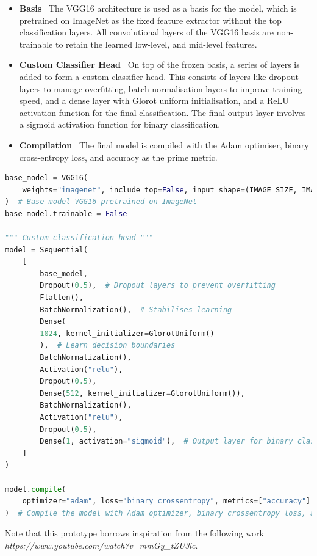 \documentclass[../main]{subfiles}
\begin{document}
\begin{itemize}
	\item \textbf{Basis} \textemdash\ The VGG16 architecture is used as a basis for the model, which is pretrained on ImageNet as the fixed feature extractor without the top classification layers. All convolutional layers of the VGG16 basis are non-trainable to retain the learned low-level, and mid-level features.
	\item \textbf{Custom Classifier Head} \textemdash\ On top of the frozen basis, a series of layers is added to form a custom classifier head. This consists of layers like dropout layers to manage overfitting, batch normalisation layers to improve training speed, and a dense layer with Glorot uniform initialisation, and a ReLU activation function for the final classification. The final output layer involves a sigmoid activation function for binary classification.
	\item \textbf{Compilation} \textemdash\ The final model is compiled with the Adam optimiser, binary cross-entropy loss, and accuracy as the prime metric.
\end{itemize}

\begin{lstlisting}[language=Python, caption={Prototype model definition.}]
base_model = VGG16(
	weights="imagenet", include_top=False, input_shape=(IMAGE_SIZE, IMAGE_SIZE, 3)
)  # Base model VGG16 pretrained on ImageNet
base_model.trainable = False

""" Custom classification head """
model = Sequential(
	[
	    base_model,
	    Dropout(0.5),  # Dropout layers to prevent overfitting
	    Flatten(),
	    BatchNormalization(),  # Stabilises learning
	    Dense(
		1024, kernel_initializer=GlorotUniform()
	    ),  # Learn decision boundaries
	    BatchNormalization(),
	    Activation("relu"),
	    Dropout(0.5),
	    Dense(512, kernel_initializer=GlorotUniform()),
	    BatchNormalization(),
	    Activation("relu"),
	    Dropout(0.5),
	    Dense(1, activation="sigmoid"),  # Output layer for binary classification
	]
)

model.compile(
	optimizer="adam", loss="binary_crossentropy", metrics=["accuracy"]
)  # Compile the model with Adam optimizer, binary crossentropy loss, and accuracy metric
\end{lstlisting}

\noindent Note that this prototype borrows inspiration from the following work \\ \textit{https://www.youtube.com/watch?v=mmGy\_tZU3lc}.
\end{document}
